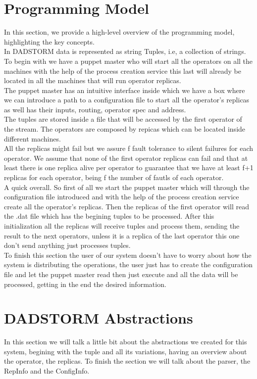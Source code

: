 \documentclass[times, 10pt, twocolumn]{article}
\begin{document}
\section{Programming Model}
In this section, we provide a high-level overview of the programming model, highlighting the key concepts. 
\\In DADSTORM data is represented as string Tuples, i.e, a collection of strings.
\\To begin with we have a puppet master who will start all the operators on all the machines with the help of the process creation service this last will already be located in all the machines that will run operator replicas.
\\The puppet master has an intuitive interface inside which we have a box where we can introduce a path to a configuration file to start all the operator's replicas as well has their inputs, routing, operator spec and address.
\\The tuples are stored inside a file that will be accessed by the first operator of the stream. The operators are composed by repicas which can be located inside different machines.
\\All the replicas might fail but we assure f fault tolerance to silent failures for each operator. We assume that none of the first operator replicas can fail and that at least there is one replica alive per operator to guarantee that we have at least f+1 replicas for each operator, being f the number of fautls of each operator.
\\A quick overall. So first of all we start the puppet master which will through the configuration file introduced and with the help of the process creation service create all the operator's replicas. Then the replicas of the first operator will read the .dat file which has the begining tuples to be processed. After this initialization all the replicas will receive tuples and process them, sending the result to the next operators, unless it is a replica of the last operator this one don't send anything just processes tuples.
\\To finish this section the user of our system doesn't have to worry about how the system is distributing the operations, the user just has to create the configuration file and let the puppet master read then just execute and all the data will be processed, getting in the end the desired information.



\section{DADSTORM Abstractions}
In this section we will talk a little bit about the abstractions we created for this system, begining with the tuple and all its variations, having an overview about the operator, the replicas. To finish the section we will talk about the parser, the RepInfo and the ConfigInfo.
\end{document}
